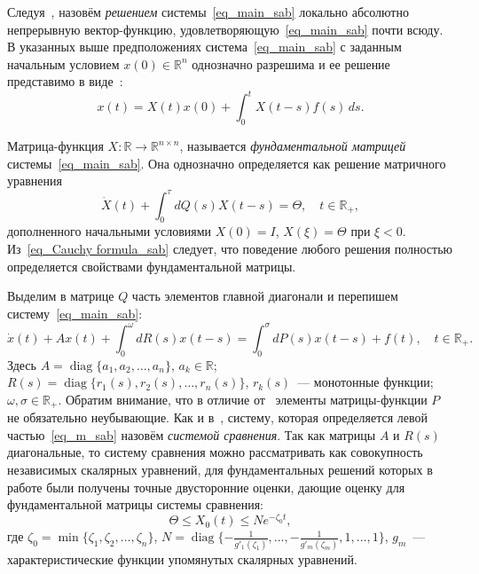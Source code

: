 Следуя~\cite[с.\,9--10]{bib_amr_sab}, назовём {\it решением} системы~\eqref{eq_main_sab} локально абсолютно непрерывную вектор-функцию, удовлетворяющую~\eqref{eq_main_sab} почти всюду. В указанных выше предположениях система~\eqref{eq_main_sab} с заданным начальным условием $x(0)\in\mathbb R^{n}$ однозначно разрешима и ее решение представимо в виде~\cite[с.\,84]{bib_amr_sab}:
\begin{equation}
\label{eq_Cauchy formula_sab}
x(t)=X(t)x(0)+\int_0^t X(t-s)f(s)\,ds.
\end{equation}

Матрица-функция $X\colon\mathbb R\to\mathbb R^{n\times n}$, называется {\it фундаментальной матрицей} системы~\eqref{eq_main_sab}. Она однозначно определяется как решение матричного уравнения
\begin{equation*}
\dot X(t)+\int_0^\tau dQ(s)X(t-s)=\Theta,\quad t\in\mathbb R_+,
\end{equation*}
дополненного начальными условиями $X(0)=I$, $ X(\xi)=\Theta$ при $\xi<0.$
Из~\eqref{eq_Cauchy formula_sab} следует, что поведение любого решения полностью определяется свойствами фундаментальной матрицы.

Выделим в матрице $Q$ часть элементов главной диагонали и перепишем систему~\eqref{eq_main_sab}:
\begin{equation}
\label{eq_m_sab}
\dot x(t)+Ax(t)+\int_0^\omega dR(s)x(t-s)=\int_0^\sigma dP(s)x(t-s)+f(t),\quad t\in\mathbb R_+.
\end{equation}
Здесь $A=\mathop{\mathrm{diag}}\{a_1,a_2,\ldots,a_n\}$, $a_k\in \mathbb R$; $R(s)=\mathop{\mathrm{diag}}\{r_1(s),r_2(s),\ldots,r_n(s)\}$, $r_k(s)$~--- монотонные функции; $\omega,\sigma\in\mathbb R_+$.
Обратим внимание, что в отличие от~\cite{bib_sab_mal_sbam_sab} элементы матрицы-функции $P$ не обязательно неубывающие.
Как и в~\cite{bib_sab_mal_sbam_sab}, систему, которая определяется левой частью~\eqref{eq_m_sab}
назовём {\it системой сравнения}.
Так как матрицы $A$ и $R(s)$ диагональные, то систему сравнения можно рассматривать как совокупность независимых скалярных уравнений, для фундаментальных решений которых в работе \cite{bib_MCh_sab} были получены точные двусторонние оценки, дающие оценку для фундаментальной матрицы системы сравнения:
\begin{equation}\label{eq_es_0_sab}
\Theta \le X_0(t)\le Ne^{-\zeta_0 t},
\end{equation}
где $\zeta_0=\min{}\{\zeta_1,\zeta_2,\ldots,\zeta_n\}$, $N=\mathop{\mathrm{diag}}{}\{-\frac1{g'_1(\zeta_1)},\ldots,-\frac1{g'_m(\zeta_m)},1,\ldots,1\}$, $g_m$~--- характеристические функции упомянутых скалярных уравнений.

